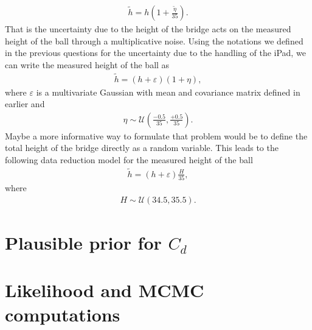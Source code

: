 \documentclass{article}
\begin{document}
\begin{enumerate}
\begin{align*}
 \tilde{h} = h \left( 1 + \frac{\tilde{\eta}}{35} \right).
\end{align*}
That is the uncertainty due to the height of the bridge acts on the
       measured height of the ball through a multiplicative noise.  
Using the notations we defined in the previous questions for the
       uncertainty due to the handling of the iPad, we can write the
       measured height of the ball as 
\begin{align*}
 \tilde{h} = \left( h + \varepsilon \right) (1 + \eta),
\end{align*}
where $\varepsilon$ is a multivariate Gaussian with mean and covariance
       matrix defined in earlier and  
\begin{align*}
 \eta \sim \mathcal{U}\left( \frac{-0.5}{35}, \frac{+0.5}{35} \right) .
\end{align*}
Maybe a more informative way to formulate that problem would be to
       define the total height of the bridge directly as a random
       variable. This leads to the following data reduction model for
       the measured height of the ball 
\begin{align*}
 \tilde{h} = ( h  + \varepsilon ) \frac{H}{35},
\end{align*}
where
\begin{align*}
 H \sim \mathcal{U} \left( 34.5, 35.5 \right).
\end{align*}
\end{enumerate}

\section{Plausible prior for $C_d$}

\section{Likelihood and MCMC computations}
\end{document}
